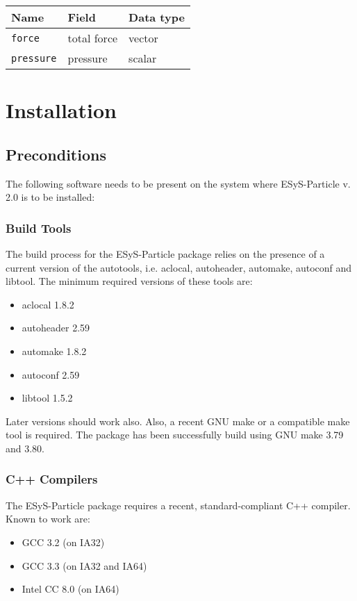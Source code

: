 \documentclass{manual}
\begin{document}
\begin{tabular}{|l|p{3.5cm}|l|}
\hline
Name & Field & Data type \\
\hline \hline
\verb{force{ & total force & vector \\
\hline
\verb{pressure{ & pressure & scalar \\
\hline
\end{tabular}




\chapter{Installation}

\section{Preconditions}

The following software needs to be present on the system where ESyS-Particle v. 2.0 is to be installed:

\subsection{Build Tools}

The build process for the ESyS-Particle package relies on the presence of a current version of the autotools, i.e. \textsf{aclocal, autoheader, automake, autoconf } and \textsf{libtool}.  The minimum required versions of these tools are:
\begin{itemize}
\item aclocal 1.8.2
\item autoheader 2.59
\item automake 1.8.2
\item autoconf 2.59
\item libtool 1.5.2
\end{itemize}
Later versions should work also. Also, a recent GNU {\sf make} or a compatible make tool is required. The package has been successfully build using GNU {\sf make 3.79} and 3.80. 

\subsection{C++ Compilers}

The ESyS-Particle package requires a recent, standard-compliant C++ compiler. Known to work are:
\begin{itemize}
\item GCC 3.2 (on IA32)
\item GCC 3.3 (on IA32 and IA64)
\item Intel CC 8.0 (on IA64)
\end{itemize}
\end{document}
